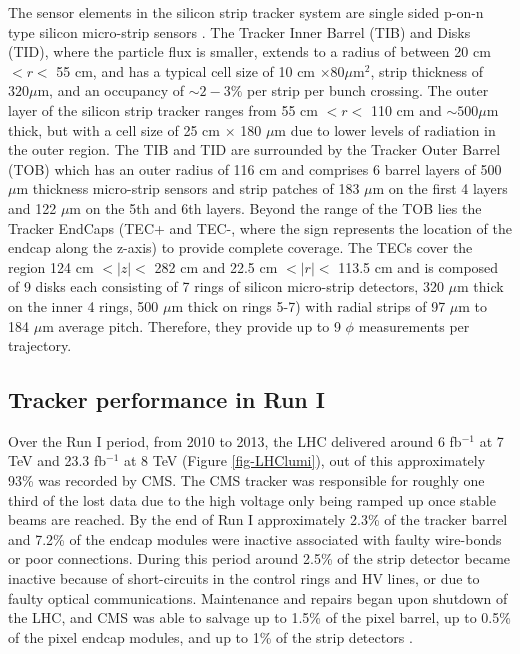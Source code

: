 The sensor elements in the silicon strip tracker system are single sided p-on-n type silicon micro-strip sensors \cite{SiliconStripSensors1,SiliconStripSensors2}. The Tracker Inner Barrel (TIB) and Disks (TID), where the particle flux is smaller, extends to a radius of between 20 cm $< r <$ 55 cm, and has a typical cell size of 10 cm $\times 80 \mu$m$^2$, strip thickness of $320 \mu$m, and an occupancy of $\sim2-3\%$ per strip per bunch crossing. The outer layer of the silicon strip tracker ranges from 55 cm $< r <$ 110 cm and $\sim500 \mu$m thick, but with a cell size of 25 cm $\times$ 180 $\mu$m due to lower levels of radiation in the outer region. The TIB and TID are surrounded by the Tracker Outer Barrel (TOB) which has an outer radius of 116 cm and comprises 6 barrel layers of 500 $\mu$m thickness micro-strip sensors and strip patches of 183 $\mu$m on the first 4 layers and 122 $\mu$m on the 5th and 6th layers. Beyond the range of the TOB lies the Tracker EndCaps (TEC+ and TEC-, where the sign represents the location of the endcap along the z-axis) to provide complete coverage. The TECs cover the region 124 cm $<|z|<$ 282 cm and 22.5 cm $<|r|<$ 113.5 cm and is composed of 9 disks each consisting of 7 rings of silicon micro-strip detectors, 320 $\mu$m thick on the inner 4 rings, 500 $\mu$m thick on rings 5-7) with radial strips of 97 $\mu$m to 184 $\mu$m average pitch. Therefore, they provide up to 9 $\phi$ measurements per trajectory.

\subsection{Tracker performance in Run I} \label{subsec-TrackerPerformance}

Over the Run I period, from 2010 to 2013, the LHC delivered around 6 fb$^{-1}$ at 7 TeV and 23.3 fb$^{-1}$ at 8 TeV (Figure \ref{fig-LHClumi}), out of this approximately 93\% was recorded by CMS. The CMS tracker was responsible for roughly one third of the lost data due to the high voltage only being ramped up once stable beams are reached. By the end of Run I approximately 2.3\% of the tracker barrel and 7.2\% of the endcap modules were inactive associated with faulty wire-bonds or poor connections. During this period around 2.5\% of the strip detector became inactive because of short-circuits in the control rings and HV lines, or due to faulty optical communications. Maintenance and repairs began upon shutdown of the LHC, and CMS was able to salvage up to 1.5\% of the pixel barrel, up to 0.5\% of the pixel endcap modules, and up to 1\% of the strip detectors \cite{TrackerPerformance}.

